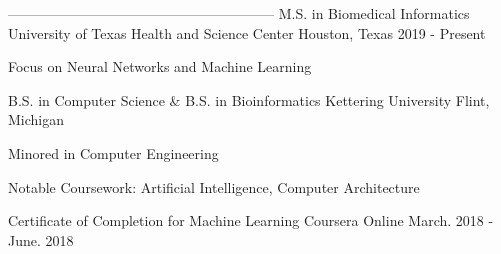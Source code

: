 
\begin{cventries}

---------------------------------------------------------
  \cventry
    {M.S. in Biomedical Informatics}
    {University of Texas Health and Science Center} %
    {Houston, Texas} %
    {2019 - Present} %
    {
      \begin{cvitems} %
        \item {Focus on Neural Networks and Machine Learning}
      \end{cvitems}
    }


  \cventry
    {B.S. in Computer Science \& B.S. in Bioinformatics} %
    {Kettering University} %
    {Flint, Michigan} %
    {
      \begin{cvitems} %
        \item {Minored in Computer Engineering}
        \item {Notable Coursework: Artificial Intelligence, Computer Architecture}
      \end{cvitems}
    }


  \cventry
    {Certificate of Completion for Machine Learning} %
    {Coursera} %
    {Online} %
    {March. 2018 - June. 2018} %
    {
      \begin{cvitems} %
      \end{cvitems}
    }

\end{cventries}
